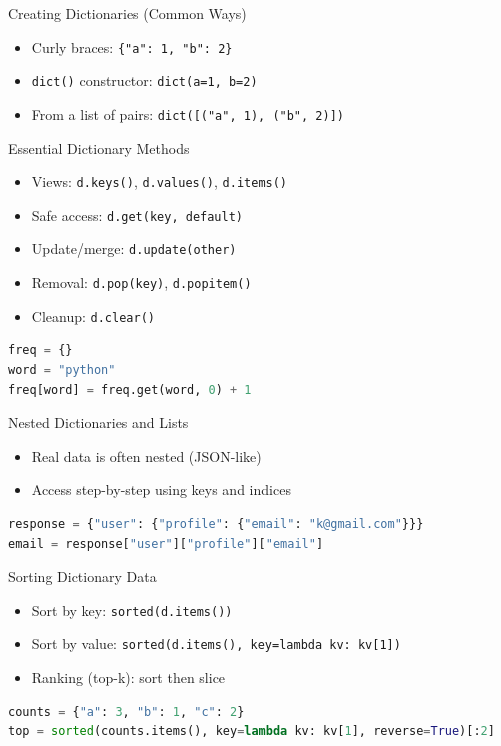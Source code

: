\documentclass{beamer}
\begin{document}
\begin{frame}[fragile]{Creating Dictionaries (Common Ways)}
  \begin{itemize}[<+->]
    \item Curly braces: \texttt{\{"a": 1, "b": 2\}}
    \item \texttt{dict()} constructor: \texttt{dict(a=1, b=2)}
    \item From a list of pairs: \texttt{dict([("a", 1), ("b", 2)])}
  \end{itemize}
\end{frame}

\begin{frame}[fragile]{Essential Dictionary Methods}
  \begin{itemize}[<+->]
    \item Views: \texttt{d.keys()}, \texttt{d.values()}, \texttt{d.items()}
    \item Safe access: \texttt{d.get(key, default)}
    \item Update/merge: \texttt{d.update(other)}
    \item Removal: \texttt{d.pop(key)}, \texttt{d.popitem()}
    \item Cleanup: \texttt{d.clear()}
  \end{itemize}
  \vspace{0.3em}
  \begin{lstlisting}[language=Python]
freq = {}
word = "python"
freq[word] = freq.get(word, 0) + 1
  \end{lstlisting}
\end{frame}

\begin{frame}[fragile]{Nested Dictionaries and Lists}
  \begin{itemize}[<+->]
    \item Real data is often nested (JSON-like)
    \item Access step-by-step using keys and indices
  \end{itemize}
  \vspace{0.3em}
  \begin{lstlisting}[language=Python]
response = {"user": {"profile": {"email": "k@gmail.com"}}}
email = response["user"]["profile"]["email"]
  \end{lstlisting}
\end{frame}

\begin{frame}[fragile]{Sorting Dictionary Data}
  \begin{itemize}[<+->]
    \item Sort by key: \texttt{sorted(d.items())}
    \item Sort by value: \texttt{sorted(d.items(), key=lambda kv: kv[1])}
    \item Ranking (top-k): sort then slice
  \end{itemize}
  \vspace{0.3em}
  \begin{lstlisting}[language=Python]
counts = {"a": 3, "b": 1, "c": 2}
top = sorted(counts.items(), key=lambda kv: kv[1], reverse=True)[:2]
  \end{lstlisting}
\end{frame}
\end{document}
